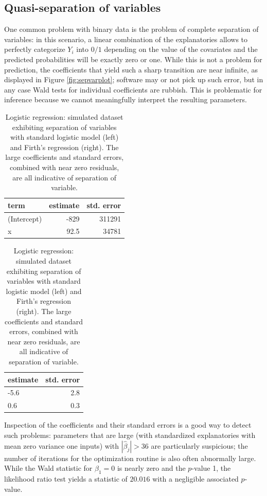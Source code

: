 \documentclass[
  11pt,
  letterpaper,
]{book}
\theoremstyle{definition}
\theoremstyle{definition}
\theoremstyle{definition}
\theoremstyle{definition}
\theoremstyle{remark}
\begin{document}
\hypertarget{quasi-separation-of-variables}{%
\subsection{Quasi-separation of variables}\label{quasi-separation-of-variables}}

One common problem with binary data is the problem of complete
separation of variables: in this scenario, a linear combination of the
explanatories allows to perfectly categorize \(Y_i\) into \(0/1\) depending
on the value of the covariates and the predicted probabilities will be
exactly zero or one. While this is not a problem for prediction, the
coefficients that yield such a sharp transition are near infinite, as
displayed in Figure \ref{fig:sepvarplot}; software may or not pick up
such error, but in any case Wald tests for individual coefficients are
rubbish. This is problematic for inference because we cannot
meaningfully interpret the resulting parameters.

\begin{table}
\caption{\label{tab:quasisepvar}Logistic regression: simulated dataset exhibiting separation of variables with standard logistic model (left) and Firth's regression (right). The large coefficients and standard errors, combined with near zero residuals, are all indicative of separation of variable.}

\centering
\begin{tabular}[t]{lrr}
\toprule
term & estimate & std. error\\
\midrule
(Intercept) & -829 & 311291\\
x & 92.5 & 34781\\
\bottomrule
\end{tabular}
\centering
\begin{tabular}[t]{lr}
\toprule
estimate & std. error\\
\midrule
-5.6 & 2.8\\
0.6 & 0.3\\
\bottomrule
\end{tabular}
\end{table}

Inspection of the coefficients and their standard errors is a good way to detect such problems: parameters that are large (with standardized explanatories with mean zero variance one inputs) with \(|\widehat{\beta}_j| > 36\) are particularly suspicious; the number of iterations for the optimization routine is also often abnormally large. While the Wald statistic for \(\beta_1=0\) is nearly zero and the \(p\)-value 1, the likelihood ratio test yields a statistic of \(20.016\) with a negligible associated \(p\)-value.
\end{document}
